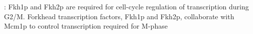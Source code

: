 \documentclass[]{article}
\begin{document}
%
%
%
%

\cite{kumar2000forkhead}: Fkh1p and Fkh2p are required for cell-cycle regulation of transcription during G2/M. Forkhead transcription factors, Fkh1p and Fkh2p, collaborate with Mcm1p to control transcription required for M-phase
\end{document}
